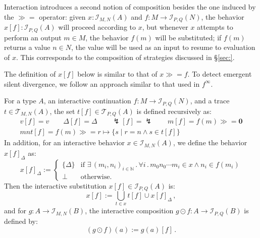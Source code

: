 \documentclass[acmsmall,timestamp,review,anonymous]{acmart}
\newcommand{\kw}[1]{\ensuremath{ \mathsf{#1} }}
\newcommand{\bind}{\gg\!\!=}
\begin{document}
Interaction introduces a second notion of composition
besides the one induced by the $\bind$ operator:
given
$x : \mathcal{I}_{M,N}(A)$ and
$f : M \rightarrow \mathcal{I}_{P,Q}(N)$,
the behavior $x[f] : \mathcal{I}_{P,Q}(A)$
will proceed according to $x$,
but whenever $x$ attempts to perform an output $m \in M$,
the behavior $f(m)$ will be substituted;
if $f(m)$ returns a value $n \in N$,
the value will be used as an input to resume to evaluation of $x$.
This corresponds to the composition of strategies
discussed in \S\ref{sec:}.


The definition of $x[f]$ below is similar to that of $x \bind f$.
To detect emergent silent divergence,
we follow an approach similar to that used in $f^\infty$.

\begin{definition}[Substitution] %
For a type $A$,
an interactive continuation $f : M \rightarrow \mathcal{I}_{P,Q}(N)$,
and a trace $t \in \mathcal{T}_{M,N}(A)$,
the set $t[f] \in \mathcal{T}_{P,Q}(A)$
is defined recursively as:
\begin{gather*}
  v[f] = v \qquad
  \Delta[f] = \Delta \qquad
  \lightning[f] = \lightning \qquad
  m[f] = f(m) \bind \mathbf{0} \\
  mnt[f] = f(m) \bind
    r \mapsto \{ s \mid r = n \wedge s \in t[f] \}
\end{gather*}
In addition, for an interactive behavior $x \in \mathcal{I}_{M,N}(A)$,
we define the behavior $x[f]_\Delta$ as:
\[
    x[f]_\Delta :=
    \begin{cases}
      \{ \Delta \} & \mbox{if }
      \exists \, (m_i, n_i)_{i \in \mathbb{N}} \,.\,
      \forall i \,.\,
        m_0 n_0 \cdots m_i \in x \wedge
        n_i \in f(m_i) \\
      \bot & \mbox{otherwise.}
    \end{cases}
\]
Then the interactive substitution
$x[f] \in \mathcal{I}_{P,Q}(A)$ is:
\[
    x[f] := \bigcup_{t \in x} t[f] \cup x[f]_\Delta \,,
\]
and for $g : A \rightarrow \mathcal{I}_{M,N}(B)$,
the interactive composition
$g \odot f : A \rightarrow \mathcal{I}_{P,Q}(B)$
is defined by:
\[
    (g \odot f)(a) := g(a)[f] \,.
\]
\end{definition}
\end{document}
